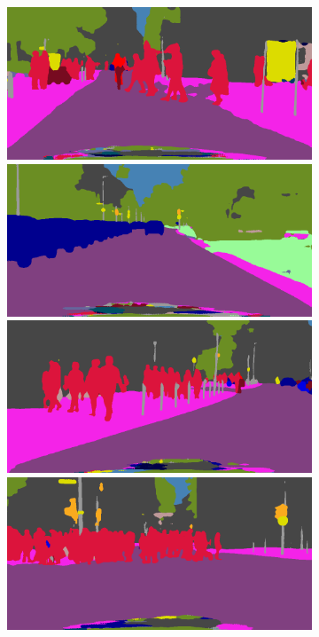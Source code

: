\begin{figure}[p]
{{\begin{subfigure}[t]{0.24\linewidth}
\begin{center}
		\includegraphics[width=\linewidth,trim={0px 60px 0 0px},clip]{results/segnet_20_output_1.png}
		\includegraphics[width=\linewidth,trim={0px 60px 0 0px},clip]{results/segnet_43_output_1.png}
		\includegraphics[width=\linewidth,trim={0px 60px 0 0px},clip]{results/segnet_204_output_1.png}
		\includegraphics[width=\linewidth,trim={0px 60px 0 0px},clip]{results/segnet_149_output_1.png}

\end{center}
\end{subfigure}}}
\end{figure}
